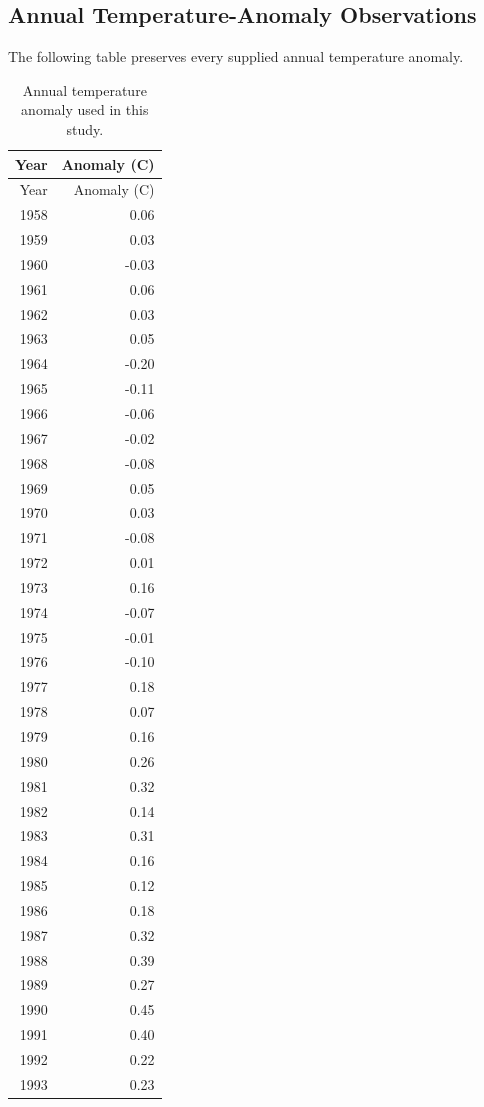 \documentclass{mcmthesis}
\begin{document}
\begin{appendices}
\section{Annual Temperature-Anomaly Observations}
The following table preserves every supplied annual temperature anomaly.
\begin{longtable}{rr}
\caption{Annual temperature anomaly used in this study.}\\
\toprule Year & Anomaly (C) \\ \midrule
\endfirsthead
\toprule Year & Anomaly (C) \\ \midrule
\endhead
1958 & 0.06 \\
1959 & 0.03 \\
1960 & -0.03 \\
1961 & 0.06 \\
1962 & 0.03 \\
1963 & 0.05 \\
1964 & -0.20 \\
1965 & -0.11 \\
1966 & -0.06 \\
1967 & -0.02 \\
1968 & -0.08 \\
1969 & 0.05 \\
1970 & 0.03 \\
1971 & -0.08 \\
1972 & 0.01 \\
1973 & 0.16 \\
1974 & -0.07 \\
1975 & -0.01 \\
1976 & -0.10 \\
1977 & 0.18 \\
1978 & 0.07 \\
1979 & 0.16 \\
1980 & 0.26 \\
1981 & 0.32 \\
1982 & 0.14 \\
1983 & 0.31 \\
1984 & 0.16 \\
1985 & 0.12 \\
1986 & 0.18 \\
1987 & 0.32 \\
1988 & 0.39 \\
1989 & 0.27 \\
1990 & 0.45 \\
1991 & 0.40 \\
1992 & 0.22 \\
1993 & 0.23 \\

\end{longtable}
\end{appendices}
\end{document}
